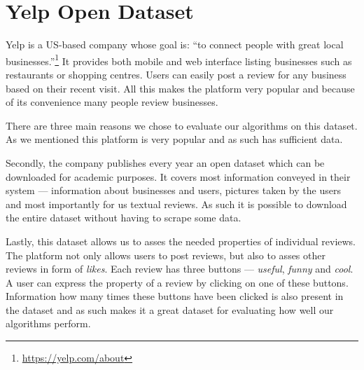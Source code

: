 \chapter{Yelp Open Dataset}

Yelp is a US-based company whose goal is: ``to connect people with great local businesses.''\footnote{\url{https://yelp.com/about}}
It provides both mobile and web interface listing businesses such as restaurants or shopping centres.
Users can easily post a review for any business based on their recent visit.
All this makes the platform very popular and because of its convenience many people review businesses.

There are three main reasons we chose to evaluate our algorithms on this dataset.
As we mentioned this platform is very popular and as such has sufficient data.

Secondly, the company publishes every year an open dataset which can be downloaded for academic
purposes.
It covers most information conveyed in their system ---  information about businesses and users, pictures taken by the users and most importantly for us textual reviews.
As such it is possible to download the entire dataset without having to scrape some data.

Lastly, this dataset allows us to asses the needed properties of individual reviews.
The platform not only allows users to post reviews, but also to asses other reviews in form of \emph{likes}.
Each review has three buttons --- \emph{useful}, \emph{funny} and \emph{cool}.
A user can express the property of a review by clicking on one of these buttons. Information how many times these buttons have been clicked is also present in the dataset and as such makes it a great dataset for evaluating how well our algorithms perform.

